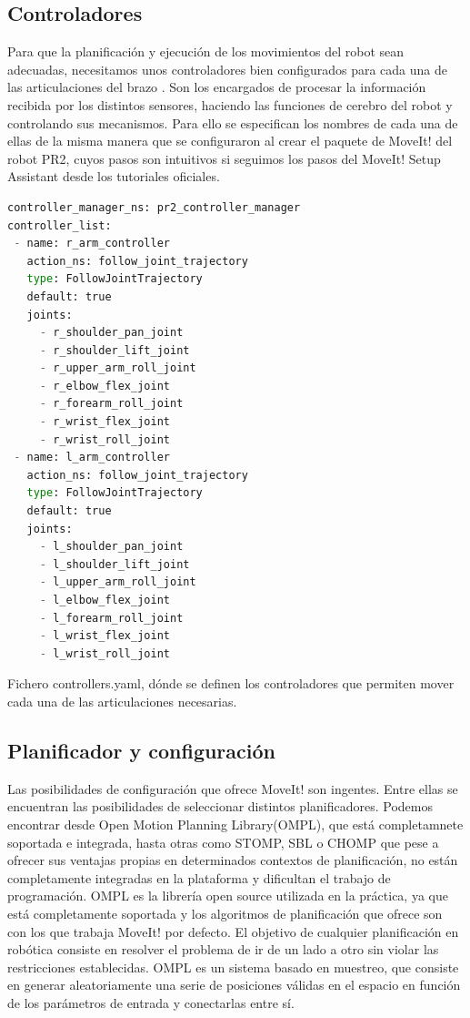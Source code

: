 \documentclass[12pt,spanish,chapterprefix, numbers=noenddot]{book}
\numberwithin{equation}{section}
\numberwithin{figure}{section}
\begin{document}
\subsection{Controladores}
Para que la planificación y ejecución de los movimientos del robot sean adecuadas, necesitamos unos controladores bien configurados para cada una de las articulaciones del brazo \cite{pr2_controllers}. Son los encargados de procesar la información recibida por los distintos sensores, haciendo las funciones de cerebro del robot y controlando sus mecanismos.
Para ello se especifican los nombres de cada una de ellas de la misma manera que se configuraron al crear el paquete de MoveIt! del robot PR2, cuyos pasos son intuitivos si seguimos los pasos del MoveIt! Setup Assistant desde los tutoriales oficiales. \cite{moveit_tutorials}
\vspace{20pt}
\begin{algorithm}[htb!]
	\begin{lstlisting}[breaklines=true,language=python] 
controller_manager_ns: pr2_controller_manager
controller_list:
 - name: r_arm_controller
   action_ns: follow_joint_trajectory
   type: FollowJointTrajectory
   default: true
   joints:
     - r_shoulder_pan_joint
     - r_shoulder_lift_joint
     - r_upper_arm_roll_joint
     - r_elbow_flex_joint
     - r_forearm_roll_joint
     - r_wrist_flex_joint
     - r_wrist_roll_joint
 - name: l_arm_controller
   action_ns: follow_joint_trajectory
   type: FollowJointTrajectory
   default: true
   joints:
     - l_shoulder_pan_joint
     - l_shoulder_lift_joint
     - l_upper_arm_roll_joint
     - l_elbow_flex_joint
     - l_forearm_roll_joint
     - l_wrist_flex_joint
     - l_wrist_roll_joint
	\end{lstlisting}
\caption{\label{alg:pr2_controllers}Fichero controllers.yaml, dónde se definen los controladores que permiten mover cada una de las articulaciones necesarias.}
\end{algorithm}
\subsection{Planificador y configuración}
Las posibilidades de configuración que ofrece MoveIt! son ingentes. Entre ellas se encuentran las posibilidades de seleccionar distintos planificadores. Podemos encontrar desde Open Motion Planning Library(OMPL), que está completamnete soportada e integrada, hasta otras como STOMP, SBL o CHOMP que pese a ofrecer sus ventajas propias en determinados contextos de planificación, no están completamente integradas en la plataforma y dificultan el trabajo de programación. 
OMPL es la librería open source utilizada en la práctica, ya que está completamente soportada y los algoritmos de planificación que ofrece son con los que trabaja MoveIt! por defecto. \cite{moveit_planners}
El objetivo de cualquier planificación en robótica consiste en resolver el problema de ir de un lado a otro sin violar las restricciones establecidas. OMPL es un sistema basado en muestreo, que consiste en generar aleatoriamente una serie de posiciones válidas en el espacio en función de los parámetros de entrada y conectarlas entre sí.
\end{document}
